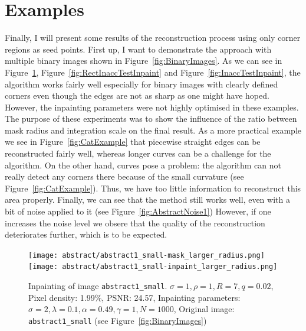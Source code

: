 \section{Examples}\label{sec:Results}
Finally, I will present some results of the reconstruction process using only corner regions as
seed points.
First up, I want to demonstrate the approach with multiple binary images shown in
Figure~\ref{fig:BinaryImages}. As we can see in Figure~\ref{fig:AbstractInpainting}, Figure~\ref{fig:RectInaccTestInpaint} and Figure~\ref{fig:InaccTestInpaint}, the algorithm works fairly well especially for binary
images with clearly defined corners even though the edges are not as sharp as one might have
hoped. However, the inpainting parameters were not highly optimised in these examples. The purpose
of these experiments was to show the influence of the ratio between mask radius and integration
scale on the final result. As a more practical example we see in Figure~\ref{fig:CatExample} that
piecewise straight edges can be reconstructed fairly well, whereas longer curves can be a challenge
for the algorithm.  On the other hand, curves pose a problem: the algorithm can
not really detect any corners there because of the small curvature (see Figure~\ref{fig:CatExample}). 
Thus, we have too little information to reconstruct this area properly. 
Finally, we can see that the method still works well, even with a bit of 
noise applied to it (see Figure~\ref{fig:AbstractNoise1})
However, if one increases the noise level we obsere that the quality of the reconstruction
deteriorates further, which is to be expected.
\begin{figure}[ht]
    \centering
    \vspace*{0.2cm}
    \texttt{[image: abstract/abstract1\_small-mask\_larger\_radius.png]}\hspace{0.2cm}
    \texttt{[image: abstract/abstract1\_small-inpaint\_larger\_radius.png]}
    \caption{Inpainting of image \texttt{abstract1\_small}. $\sigma=1,\rho=1,R=7,q=0.02$, Pixel
        density: 1.99\%, PSNR\@: 24.57, Inpainting parameters:
        $\sigma=2,\lambda=0.1,\alpha=0.49,\gamma=1,N=1000$, Original image:
        \texttt{abstract1\_small} (see Figure~\ref{fig:BinaryImages})}\label{fig:AbstractInpainting}
\end{figure}
